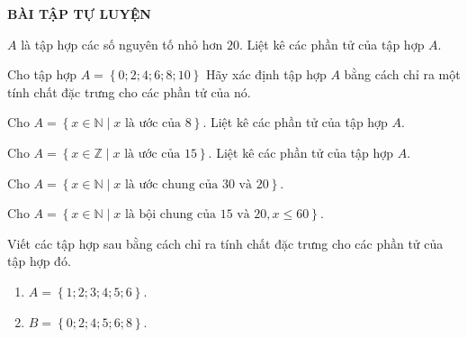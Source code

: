 \begin{center}
\textbf{BÀI TẬP TỰ LUYỆN}
\end{center}
\begin{bt}%
$A$ là tập hợp các số nguyên tố nhỏ hơn $20$. Liệt kê các phần tử của tập hợp $A$.
\end{bt}
\begin{bt}%
Cho tập hợp $A=\left\lbrace 0;2;4;6;8;10\right\rbrace$
Hãy xác định tập hợp $A$ bằng cách chỉ ra một tính chất đặc trưng cho các phần tử của nó.
\end{bt}
\begin{bt}%
Cho $A=\left\lbrace x\in \mathbb{N}\mid x \text{ là ước của }8\right\rbrace$. Liệt kê các phần tử của tập hợp $A$.
\end{bt}
\begin{bt}%
Cho $A=\left\lbrace x\in \mathbb{Z}\mid x \text{ là ước của }15\right\rbrace$. Liệt kê các phần tử của tập hợp $A$.
\end{bt}
\begin{bt}%
Cho $A=\left\lbrace x\in\mathbb{N}\mid x \text{ là ước chung của }30 \text{ và }20\right\rbrace$.
\end{bt}
\begin{bt}%
Cho $A=\left\lbrace x\in \mathbb{N} \mid x \text{ là bội chung của }15 \text{ và } 20, x\leq 60\right\rbrace$.
\end{bt}

\begin{bt}%
Viết các tập hợp sau bằng cách chỉ ra tính chất đặc trưng cho các phần tử của tập hợp đó.
\begin{enumerate}
\item $A=\left\lbrace 1;2;3;4;5;6\right\rbrace$.
\item $B=\left\lbrace 0;2;4;5;6;8\right\rbrace$.
\end{enumerate}

\end{bt}

